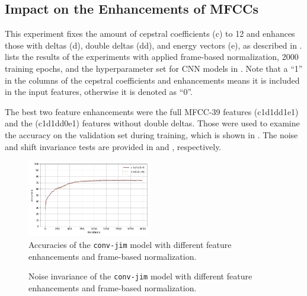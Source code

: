 \subsection{Impact on the Enhancements of MFCCs}\label{sec:exp_fs_mfcc}
This experiment fixes the amount of cepstral coefficients (c) to 12 and enhances those with deltas (d), double deltas (dd), and energy vectors (e), as described in .
 lists the results of the experiments with applied frame-based normalization, 2000 training epochs, and the hyperparameter set for CNN models in .
Note that a \enquote{1} in the columns of the cepstral coefficients and enhancements means it is included in the input features, otherwise it is denoted as \enquote{0}.

The best two feature enhancements were the full MFCC-39 features (c1d1dd1e1) and the (c1d1dd0e1) features without double deltas.
Those were used to examine the accuracy on the validation set during training, which is shown in .
The noise and shift invariance tests are provided in  and , respectively.
\begin{figure}[!ht]
  \centering
  \includegraphics[width=0.48\textwidth]{./5_exp/figs/exp_fs_mfcc_acc_conv-jim.png}
  \caption{Accuracies of the \texttt{conv-jim} model with different feature enhancements and frame-based normalization.}
  \label{fig:exp_fs_mfcc_tb_acc_conv-jim}
\end{figure}
\FloatBarrier
\noindent
\begin{figure}[!ht]
  \centering
  \qquad
  \caption{Noise invariance of the \texttt{conv-jim} model with different feature enhancements and frame-based normalization.}
  \label{fig:exp_fs_mfcc_tb_noise_conv-jim}
\end{figure}
